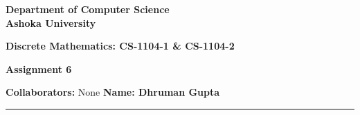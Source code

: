 \documentclass[a4paper]{article}
\begin{document}
\begin{center}
{\large \bf \color{red}  Department of Computer Science} \\
{\large \bf \color{red}  Ashoka University} \\

\vspace{0.1in}

{\large \bf \color{blue}  Discrete Mathematics: CS-1104-1 \& CS-1104-2}

\vspace{0.05in}

    { \bf \color{YellowOrange} Assignment 6}
\end{center}
\medskip

{\textbf{Collaborators:} None} \hfill {\textbf{Name: Dhruman Gupta} }

\bigskip
\hrule


\end{document}
